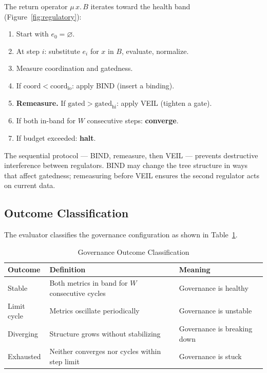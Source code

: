 \documentclass[sigconf,nonacm]{acmart}
\begin{document}
The return operator $\mu\,x.\,B$ iterates toward the health band
(Figure~\ref{fig:regulatory}):

\begin{enumerate}
\item Start with $e_0 = \varnothing$.
\item At step $i$: substitute $e_i$ for $x$ in $B$, evaluate, normalize.
\item Measure coordination and gatedness.
\item If $\mathrm{coord} < \mathrm{coord}_{\mathrm{lo}}$: apply BIND
  (insert a binding).
\item \textbf{Remeasure.} If $\mathrm{gated} > \mathrm{gated}_{\mathrm{hi}}$:
  apply VEIL (tighten a gate).
\item If both in-band for $W$ consecutive steps: \textbf{converge}.
\item If budget exceeded: \textbf{halt}.
\end{enumerate}

The sequential protocol --- BIND, remeasure, then VEIL --- prevents
destructive interference between regulators. BIND may change the tree
structure in ways that affect gatedness; remeasuring before VEIL ensures
the second regulator acts on current data.

\subsection{Outcome Classification}

The evaluator classifies the governance configuration as shown in
Table~\ref{tab:outcomes}.

\begin{table}[t]
  \caption{Governance Outcome Classification}\label{tab:outcomes}
  \small
  \begin{tabular}{@{}llp{4cm}@{}}
    \toprule
    \textbf{Outcome} & \textbf{Definition} & \textbf{Meaning} \\
    \midrule
    Stable & Both metrics in band for $W$ consecutive cycles & Governance is healthy \\
    Limit cycle & Metrics oscillate periodically & Governance is unstable \\
    Diverging & Structure grows without stabilizing & Governance is breaking down \\
    Exhausted & Neither converges nor cycles within step limit & Governance is stuck \\
    \bottomrule
  \end{tabular}
\end{table}
\end{document}
